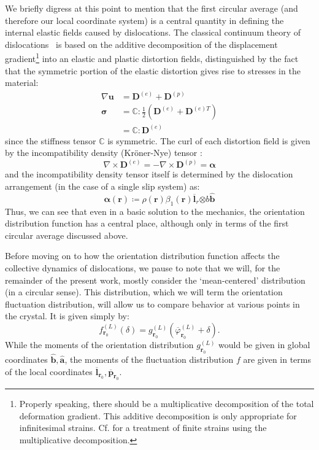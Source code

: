 We briefly digress at this point to mention that the first circular average (and therefore our local coordinate system) is a central quantity in defining the internal elastic fields caused by dislocations. The classical continuum theory of dislocations~\cite{DeWit1973} is based on the additive decomposition of the displacement gradient\footnote{Properly speaking, there should be a multiplicative decomposition of the total deformation gradient. This additive decomposition is only appropriate for infinitesimal strains. Cf. \cite{starkeyTotalLagrangeImplementation2022} for a treatment of finite strains using the multiplicative decomposition.} into an elastic and plastic distortion fields, distinguished by the fact that the symmetric portion of the elastic distortion gives rise to stresses in the material:
\begin{align}
\nabla\boldsymbol{u}&=\mathbf{D}^{(e)}+\mathbf{D}^{(p)}\\
\boldsymbol{\sigma} &=\mathbb{C} : \frac{1}{2}\left(\mathbf{D}^{(e)} + \mathbf{D}^{(e)T}\right)\\
&=\mathbb{C} : \mathbf{D}^{(e)}
\end{align}
since the stiffness tensor \(\mathbb{C}\) is symmetric. The curl of each distortion field is given by the incompatibility density (Kr\"{o}ner-Nye) tensor \cite{kroner1981continuum}:
\begin{equation}\nabla\times\mathbf{D}^{(e)}= - \nabla \times\mathbf{D}^{(p)}= \boldsymbol{\alpha}\end{equation}
and the incompatibility density tensor itself is determined by the dislocation arrangement (in the case of a single slip system) as:
\begin{equation}\boldsymbol{\alpha}\left( \boldsymbol{r} \right)\coloneqq\rho\left( \boldsymbol{r} \right)\beta_{1}\left( \boldsymbol{r} \right){\overline{\boldsymbol{l}}}_{r}\boldsymbol{\otimes}b\hat{\boldsymbol{b}}\end{equation}
Thus, we can see that even in a basic solution to the mechanics, the orientation distribution function has a central place, although only in terms of the first circular average discussed above.

Before moving on to how the orientation distribution function affects the collective dynamics of dislocations, we pause to note that we will, for the remainder of the present work, mostly consider the `mean-centered' distribution (in a circular sense). This distribution, which we will term the orientation fluctuation distribution, will allow us to compare behavior at various points in the crystal. It is given simply by:
\begin{equation}f_{\boldsymbol{r}_{0}}^{(L)}(\delta) = g_{\boldsymbol{r}_{0}}^{(L)}\left( {\overline{\varphi}}_{\boldsymbol{r}_{0}}^{(L)} + \delta \right).\end{equation}
While the moments of the orientation distribution \(g_{\boldsymbol{r}_{0}}^{(L)}\) would be given in global coordinates \(\hat{\boldsymbol{b}},\hat{\boldsymbol{a}}\), the moments of the fluctuation distribution \(f\) are given in terms of the local coordinates \({\overline{\boldsymbol{l}}}_{\boldsymbol{r}_{0}},{\overline{\boldsymbol{p}}}_{\boldsymbol{r}_{0}}.\)

